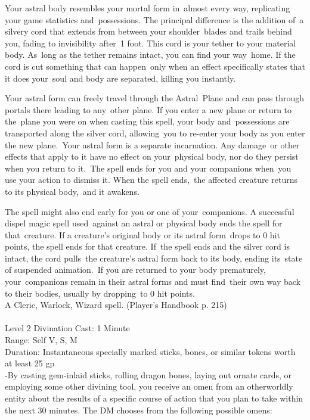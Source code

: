 \documentclass[10pt,twocolumn]{report}
\begin{document}
Your astral body resembles your mortal form in almost every way, replicating your game statistics and possessions. The principal difference is the addition of a silvery cord that extends from between your shoulder blades and trails behind you, fading to invisibility after 1 foot. This cord is your tether to your material body. As long as the tether remains intact, you can find your way home. If the cord is cut something that can happen only when an effect specifically states that it does your soul and body are separated, killing you instantly. 

Your astral form can freely travel through the Astral Plane and can pass through portals there leading to any other plane. If you enter a new plane or return to the plane you were on when casting this spell, your body and possessions are transported along the silver cord, allowing you to re-enter your body as you enter the new plane. Your astral form is a separate incarnation. Any damage or other effects that apply to it have no effect on your physical body, nor do they persist when you return to it. The spell ends for you and your companions when you use your action to dismiss it. When the spell ends, the affected creature returns to its physical body, and it awakens. 

The spell might also end early for you or one of your companions. A successful dispel magic spell used against an astral or physical body ends the spell for that creature. If a creature’s original body or its astral form drops to 0 hit points, the spell ends for that creature. If the spell ends and the silver cord is intact, the cord pulls the creature’s astral form back to its body, ending its state of suspended animation. If you are returned to your body prematurely, your companions remain in their astral forms and must find their own way back to their bodies, usually by dropping to 0 hit points.\\
A Cleric, Warlock, Wizard spell. (Player's Handbook p. 215) \\


 \\
Level 2 \quad Divination \quad Cast: 1 Minute\\
Range: Self \quad V, S, M\\
Duration: Instantaneous \quad specially marked sticks, bones, or similar tokens worth at least 25 gp\\
-By casting gem-inlaid sticks, rolling dragon bones, laying out ornate cards, or employing some other divining tool, you receive an omen from an otherworldly entity about the results of a specific course of action that you plan to take within the next 30 minutes. The DM chooses from the following possible omens: 
\end{document}

